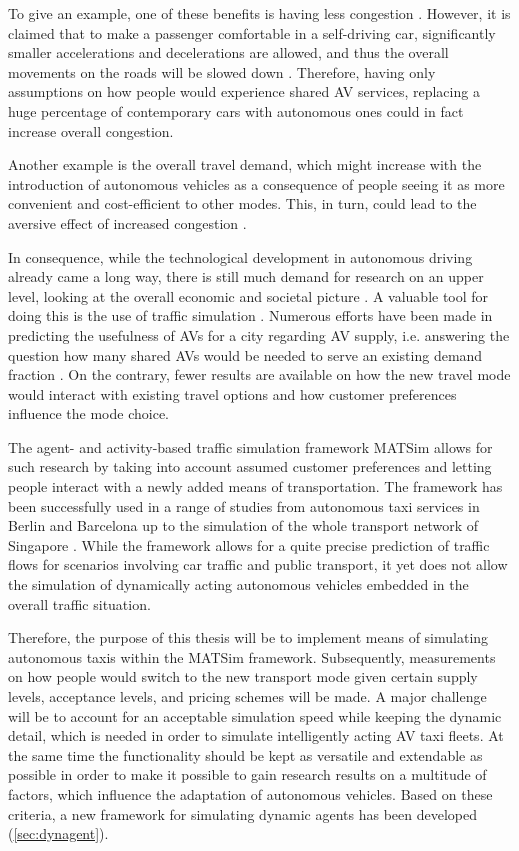 To give an example, one of these benefits is having less congestion \citep{ITF2014}. However,
it is claimed that to make a passenger comfortable in a self-driving car,
significantly smaller accelerations and decelerations are allowed, and thus the
overall movements on the roads will be slowed down \citep{LeVine2015}. Therefore, having only assumptions
on how people would experience shared AV services, replacing a huge percentage of
contemporary cars with autonomous ones could in fact increase overall congestion.

Another example is the overall travel demand, which might increase with the introduction
of autonomous vehicles as a consequence of people seeing it as more convenient and
cost-efficient to other modes. This, in turn, could lead to the aversive effect
of increased congestion \citep{Litman2014}.

In consequence, while the technological development in autonomous driving already
came a long way, there is still much demand for research on an upper level, looking
at the overall economic and societal picture \citep{Silberg2013, SchoettleBrandon2014}. A valuable tool for doing this is the
use of traffic simulation \citep{Fagnant2014, ITF2014, Zachariah13}. Numerous efforts have been
made in predicting the usefulness of AVs for a city regarding AV supply, i.e.
answering the question how many shared AVs would be needed to serve an
existing demand fraction \citep{Bosch2015, Fagnant2015Austin}. On the contrary, fewer results are available on how the new travel
mode would interact with existing travel options and how customer preferences
influence the mode choice.

The agent- and activity-based traffic simulation framework MATSim \citep{Horni2015} allows for such
research \citep{Boesch2015} by taking into account assumed customer preferences and letting people
interact with a newly added means of transportation.
The framework has been successfully used in a range of studies from autonomous taxi services
in Berlin and Barcelona \citep{Bischoff2016} up to the simulation of the whole transport network of
Singapore \citep{Erath2014}. While the framework allows for a quite precise prediction of traffic
flows for scenarios involving car traffic and public transport, it yet does not
allow the simulation of dynamically acting autonomous vehicles embedded in the
overall traffic situation.

Therefore, the purpose of this thesis will be to implement means of simulating autonomous
taxis within the MATSim framework. Subsequently, measurements on how people would
switch to the new transport mode given certain supply levels, acceptance levels, and
pricing schemes will be made. A major challenge will be to account for an acceptable simulation
speed while keeping the dynamic detail, which is needed in order to simulate
intelligently acting AV taxi fleets. At the same time the functionality should be kept
as versatile and extendable as possible in order to make it possible to gain research
results on a multitude of factors, which influence the adaptation of autonomous
vehicles. Based on these criteria, a new framework for simulating dynamic agents
has been developed (\cref{sec:dynagent}).


